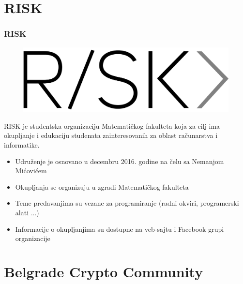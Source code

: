 \documentclass[hyperref={bookmarks=false},aspectratio=169]{beamer}
\begin{document}
\section{RISK}

\begin{frame}
\frametitle{RISK}

\vspace{-8mm}
\begin{figure}
    \raggedright
    \includegraphics[scale=0.060]{./images/riskmatf.png}
\end{figure}

RISK je studentska organizaciju Matematičkog fakulteta koja za cilj ima 
okupljanje i edukaciju studenata zainteresovanih za oblast računarstva i informatike.


\begin{itemize}
    \item Udruženje je osnovano u decembru 2016. godine na čelu sa Nemanjom Mićovićem
    \item Okupljanja se organizuju u zgradi Matematičkog fakulteta
    \item Teme predavanjima su vezane za programiranje (radni okviri, programerski alati ...) 
    \item Informacije o okupljanjima su dostupne na veb-sajtu i Facebook grupi organizacije
\end{itemize}

\end{frame}


\section{Belgrade Crypto Community}
\end{document}

